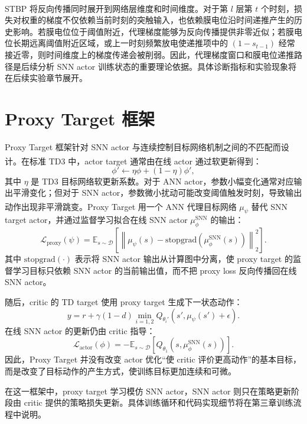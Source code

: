 \documentclass[UTF8,zihao=-4,oneside,openany]{ctexbook}
\let\oldcite\cite
\renewcommand{\cite}[1]{\textsuperscript{\oldcite{#1}}}
\begin{document}
STBP 将反向传播同时展开到网络层维度和时间维度\cite{wu2018stbp}。对于第 $l$ 层第 $t$ 个时刻，损失对权重的梯度不仅依赖当前时刻的突触输入，也依赖膜电位沿时间递推产生的历史影响。若膜电位位于阈值附近，代理梯度能够为反向传播提供非零近似；若膜电位长期远离阈值附近区域，或上一时刻频繁放电使递推项中的 $(1-s_{t-1})$ 经常接近零，则时间维度上的梯度传递会被削弱。因此，代理梯度窗口和膜电位递推路径是后续分析 SNN actor 训练状态的重要理论依据。具体诊断指标和实验现象将在后续实验章节展开。

\section{Proxy Target 框架}
\label{sec:proxy-target-framework}
Proxy Target 框架针对 SNN actor 与连续控制目标网络机制之间的不匹配而设计\cite{xu2025proxy}。在标准 TD3 中，actor target 通常由在线 actor 通过软更新得到：
\begin{equation}
\phi' \leftarrow \eta \phi + (1-\eta)\phi',
\end{equation}
其中 $\eta$ 是 TD3 目标网络软更新系数。对于 ANN actor，参数小幅变化通常对应输出平滑变化；但对于 SNN actor，参数微小扰动可能改变阈值触发时刻，导致输出动作出现非平滑跳变\cite{xu2025proxy}。Proxy Target 用一个 ANN 代理目标网络 $\mu_{\psi}$ 替代 SNN target actor，并通过监督学习拟合在线 SNN actor $\mu_{\phi}^{\mathrm{SNN}}$ 的输出：
\begin{equation}
\mathcal{L}_{\mathrm{proxy}}(\psi)
=
\mathbb{E}_{s\sim\mathcal{D}}
\left[
\left\|
\mu_{\psi}(s)-\mathrm{stopgrad}\left(\mu_{\phi}^{\mathrm{SNN}}(s)\right)
\right\|_2^2
\right].
\end{equation}
其中 $\mathrm{stopgrad}(\cdot)$ 表示将 SNN actor 输出从计算图中分离，使 proxy target 的监督学习目标只依赖 SNN actor 的当前输出值，而不把 proxy loss 反向传播回在线 SNN actor。

随后，critic 的 TD target 使用 proxy target 生成下一状态动作：
\begin{equation}
y=r+\gamma(1-d)\min_{i=1,2}Q_{\theta_i'}(s',\mu_{\psi}(s')+\epsilon).
\end{equation}
在线 SNN actor 的更新仍由 critic 指导：
\begin{equation}
\mathcal{L}_{\mathrm{actor}}(\phi)
=
-\mathbb{E}_{s\sim\mathcal{D}}
\left[
Q_{\theta_1}(s,\mu_{\phi}^{\mathrm{SNN}}(s))
\right].
\end{equation}
因此，Proxy Target 并没有改变 actor 优化“使 critic 评价更高动作”的基本目标，而是改变了目标动作的产生方式，使训练目标更加连续和可微。

在这一框架中，proxy target 学习模仿 SNN actor，SNN actor 则只在策略更新阶段由 critic 提供的策略损失更新。具体训练循环和代码实现细节将在第三章训练流程中说明。
\end{document}
